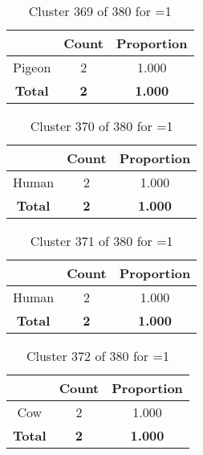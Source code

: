 \begin{table}[ht!]
\centering
\begin{tabular}{|c|c|c|}
\hline
\bf \Spec{} &\bf Count &\bf Proportion\\ \hline \hline
Pigeon & 2 & 1.000\\ \hline
\hline
\bf Total & \bf 2 & \bf 1.000\\ \hline
\end{tabular}
\label{tab:cluster:369:1}
\caption{Cluster 369 of 380 for \minneigh{}=1}
\end{table}

\clearpage
\begin{table}[ht!]
\centering
\begin{tabular}{|c|c|c|}
\hline
\bf \Spec{} &\bf Count &\bf Proportion\\ \hline \hline
Human & 2 & 1.000\\ \hline
\hline
\bf Total & \bf 2 & \bf 1.000\\ \hline
\end{tabular}
\label{tab:cluster:370:1}
\caption{Cluster 370 of 380 for \minneigh{}=1}
\end{table}

\begin{table}[ht!]
\centering
\begin{tabular}{|c|c|c|}
\hline
\bf \Spec{} &\bf Count &\bf Proportion\\ \hline \hline
Human & 2 & 1.000\\ \hline
\hline
\bf Total & \bf 2 & \bf 1.000\\ \hline
\end{tabular}
\label{tab:cluster:371:1}
\caption{Cluster 371 of 380 for \minneigh{}=1}
\end{table}

\begin{table}[ht!]
\centering
\begin{tabular}{|c|c|c|}
\hline
\bf \Spec{} &\bf Count &\bf Proportion\\ \hline \hline
Cow & 2 & 1.000\\ \hline
\hline
\bf Total & \bf 2 & \bf 1.000\\ \hline
\end{tabular}
\label{tab:cluster:372:1}
\caption{Cluster 372 of 380 for \minneigh{}=1}
\end{table}

